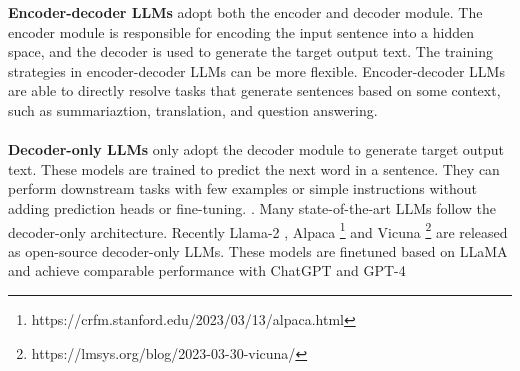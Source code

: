 \textbf{Encoder-decoder LLMs} adopt both the encoder and decoder module. The encoder module is responsible for encoding the input sentence into a hidden space, and the decoder is used to generate the target output text. The training strategies in encoder-decoder LLMs can be more flexible. Encoder-decoder LLMs are able to directly resolve tasks that generate sentences based on some context, such as summariaztion, translation, and question answering.\\\\
\textbf{Decoder-only LLMs} only adopt the decoder module to generate target output text. These models are trained to predict the next word in a sentence. They can perform downstream tasks with few examples or simple instructions without adding prediction heads or fine-tuning.  \cite{liu2022fewshot}. Many state-of-the-art LLMs follow the decoder-only architecture. Recently Llama-2 \cite{touvron2023llama2}, Alpaca \footnote{https://crfm.stanford.edu/2023/03/13/alpaca.html} and Vicuna \footnote{ https://lmsys.org/blog/2023-03-30-vicuna/} are released as open-source decoder-only LLMs. These models are finetuned based on LLaMA \cite{touvron2023llama} and achieve comparable performance with ChatGPT \cite{ouyang2022training} and GPT-4